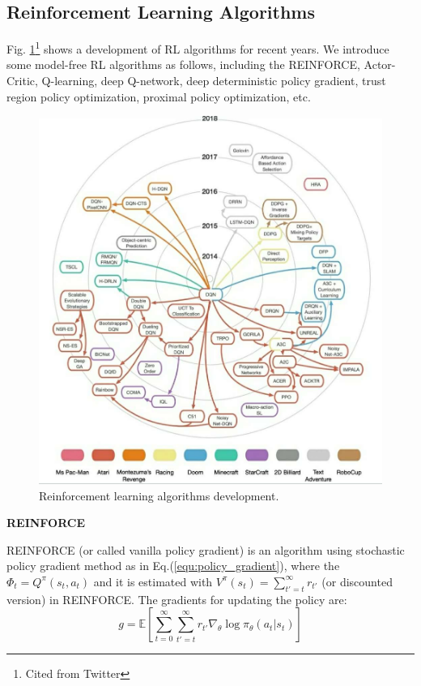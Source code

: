 \documentclass{article}
\begin{document}
\subsection{Reinforcement Learning Algorithms}
Fig. \ref{fig:rl}\footnote{Cited from Twitter} shows a development of RL algorithms for recent years. We introduce some model-free RL algorithms as follows, including the REINFORCE, Actor-Critic, Q-learning, deep Q-network, deep deterministic policy gradient, trust region policy optimization, proximal policy optimization, etc.
\begin{figure}[htbp]
	\centering
	\includegraphics[scale=0.4]{img/rl.jpg}
	\caption{Reinforcement learning algorithms development.}
	\label{fig:rl}
\end{figure}

\textbf{REINFORCE}

REINFORCE \cite{williams1992simple} (or called vanilla policy gradient) is an algorithm using stochastic policy gradient method as in Eq.(\ref{equ:policy_gradient}), where the $\Phi_t = Q^\pi(s_t, a_t)$ and it is estimated with $V^\pi(s_t)=\sum_{t'=t}^{\infty}r_{t'}$ (or discounted version) in REINFORCE. The gradients for updating the policy are:
\begin{equation}
    g=\mathbb{E}[\sum_{t=0}^\infty \sum_{t'=t}^{\infty}r_{t'} \nabla_\theta \log \pi_\theta(a_t|s_t)]
\end{equation}
 
\end{document}
